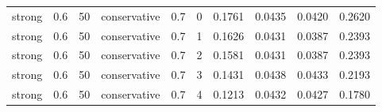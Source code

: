 \begin{table}[!htbp]
{\begin{tabular*}{\linewidth}{@{\extracolsep{\fill}}llrlrrrrrr}
strong & 0.6 & 50 & conservative & 0.7 & 0 & 0.1761 & 0.0435 & 0.0420 & 0.2620 \\
strong & 0.6 & 50 & conservative & 0.7 & 1 & 0.1626 & 0.0431 & 0.0387 & 0.2393 \\
strong & 0.6 & 50 & conservative & 0.7 & 2 & 0.1581 & 0.0431 & 0.0387 & 0.2393 \\
strong & 0.6 & 50 & conservative & 0.7 & 3 & 0.1431 & 0.0438 & 0.0433 & 0.2193 \\
strong & 0.6 & 50 & conservative & 0.7 & 4 & 0.1213 & 0.0432 & 0.0427 & 0.1780 \\
\hline
\end{tabular*}}
\end{table}
